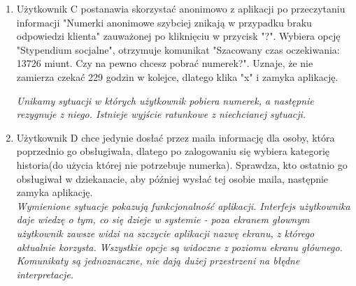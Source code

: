 \documentclass[12pt]{article}
\begin{document}
\begin {enumerate}
	\textit{Komunikaty ostrzegawcze są przedstawione w prostym języku i jednoznacznie wskazują na konsekwencję danego działania; istnieje wyjście ratunkowe z niechcianej sytuacji.}\\
	
	\item Użytkownik C postanawia skorzystać anonimowo z aplikacji po przeczytaniu informacji "Numerki anonimowe szybciej znikają w przypadku braku odpowiedzi klienta" zauważonej po kliknięciu w przycisk "?". Wybiera opcję "Stypendium socjalne", otrzymuje komunikat "Szacowany czas oczekiwania: 13726 miunt. Czy na pewno chcesz pobrać numerek?". Uznaje, że nie zamierza czekać 229 godzin w kolejce, dlatego klika "x" i zamyka aplikację.
	
	\textit{Unikamy sytuacji w których użytkownik pobiera numerek, a następnie rezygnuje z niego. Istnieje wyjście ratunkowe z niechcianej sytuacji.}\\
	
	
	\item Użytkownik D chce jedynie dosłać przez maila informację dla osoby, która poprzednio go obsługiwała, dlatego po zalogowaniu się wybiera kategorię historia(do użycia której nie potrzebuje numerka). Sprawdza, kto ostatnio go obsługiwał w dziekanacie, aby później wysłać tej osobie maila, następnie zamyka aplikację.\\
	
	\textit{Wymienione sytuacje pokazują funkcjonalność aplikacji. Interfejs użytkownika daje wiedzę o tym, co się dzieje w systemie - poza ekranem głownym użytkownik zawsze widzi na szczycie aplikacji nazwę ekranu, z którego aktualnie korzysta. Wszystkie opcje są widoczne z poziomu ekranu głównego. Komunikaty są jednoznaczne, nie dają dużej przestrzeni na błędne interpretacje.}

\end{enumerate}
\end{document}
